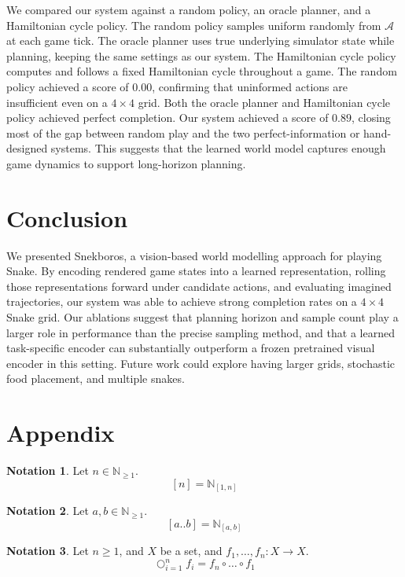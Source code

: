 \documentclass[10pt, twocolumn]{article}
\theoremstyle{definition}
\newtheorem{notation}{Notation}
\theoremstyle{remark}
\newcommand{\N}{\mathbb{N}}
\begin{document}
We compared our system against
a random policy,
an oracle planner,
and a Hamiltonian cycle policy.
The random policy samples uniform randomly from $\mathcal{A}$ at each game tick.
The oracle planner uses true underlying simulator state while planning, keeping the same settings as our system.
The Hamiltonian cycle policy computes and follows a fixed Hamiltonian cycle throughout a game.
The random policy achieved a score of $0.00$, confirming that uninformed actions are insufficient even on a $4\times4$ grid.
Both the oracle planner and Hamiltonian cycle policy achieved perfect completion.
Our system achieved a score of $0.89$, closing most of the gap between random play and the two perfect-information or hand-designed systems.
This suggests that the learned world model captures enough game dynamics to support long-horizon planning.

\section{Conclusion}

We presented Snekboros, a vision-based world modelling approach for playing Snake.
By encoding rendered game states into a learned representation, rolling those representations forward under candidate actions, and evaluating imagined trajectories, our system was able to achieve strong completion rates on a $4\times4$ Snake grid.
Our ablations suggest that planning horizon and sample count play a larger role in performance than the precise sampling method, and that a learned task-specific encoder can substantially outperform a frozen pretrained visual encoder in this setting.
Future work could explore having larger grids, stochastic food placement, and multiple snakes.

\section{Appendix}

\begin{notation}
Let $n\in\N_{\geq 1}$.
$$
	[n]=\N_{[1,n]}
$$
\end{notation}

\begin{notation}
Let $a,b\in\N_{\geq 1}$.
$$
	[a..b]=\N_{[a,b]}
$$
\end{notation}

\begin{notation}
Let $n\geq 1$, and $X$ be a set, and $f_{1},\dots,f_{n}:X\to X$.
$$
	\bigcirc_{i=1}^{n}f_{i}
	=
	f_{n}\circ\dots\circ f_{1}
$$
\end{notation}



\end{document}
